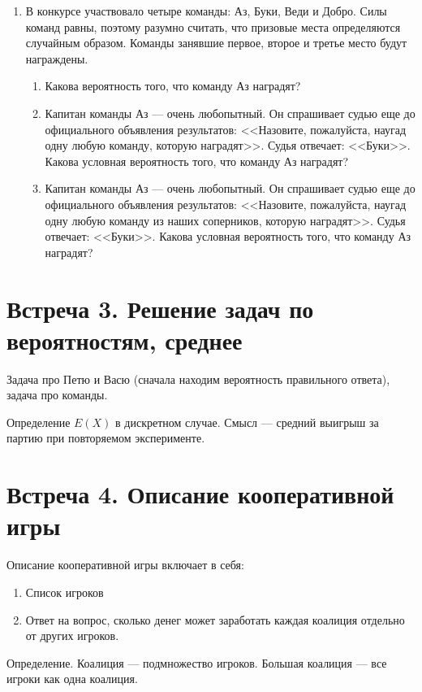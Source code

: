 \documentclass[pdftex,12pt,a4paper]{article}
\begin{document}
\begin{enumerate}
\item В конкурсе участвовало четыре команды: Аз, Буки, Веди и Добро. Силы команд равны, поэтому разумно считать, что призовые места определяются случайным образом. Команды занявшие первое, второе и третье место будут награждены. 
\begin{enumerate}
\item Какова вероятность того, что команду Аз наградят?
\item Капитан команды Аз --- очень любопытный. Он спрашивает судью еще до официального объявления результатов: <<Назовите, пожалуйста, наугад одну любую команду, которую наградят>>. Судья отвечает: <<Буки>>. Какова условная вероятность того, что команду Аз наградят?
\item Капитан команды Аз --- очень любопытный. Он спрашивает судью еще до официального объявления результатов: <<Назовите, пожалуйста, наугад одну любую команду из наших соперников, которую наградят>>. Судья отвечает: <<Буки>>. Какова условная вероятность того, что команду Аз наградят?
\end{enumerate}


\end{enumerate}

\section{Встреча 3. Решение задач по вероятностям, среднее}

Задача про Петю и Васю (сначала находим вероятность правильного ответа), задача про команды.


Определение $E(X)$ в дискретном случае. Смысл --- средний выигрыш за партию при повторяемом эксперименте.

\section{Встреча 4. Описание кооперативной игры}




Описание кооперативной игры включает в себя:
\begin{enumerate}
\item Список игроков
\item Ответ на вопрос, сколько денег может заработать каждая коалиция отдельно от других игроков.
\end{enumerate}

Определение. Коалиция --- подмножество игроков. Большая коалиция --- все игроки как одна коалиция.
\end{document}
